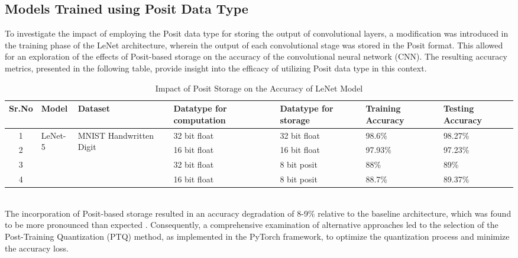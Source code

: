 \subsection{Models Trained using Posit Data Type}
To investigate the impact of employing the Posit data type for storing the output of convolutional layers, a modification was introduced in the training phase of the LeNet architecture, wherein the output of each convolutional stage was stored in the Posit format. This allowed for an exploration of the effects of Posit-based storage on the accuracy of the convolutional neural network (CNN). The resulting accuracy metrics, presented in the following table, provide insight into the efficacy of utilizing Posit data type in this context.\\
\begin{table}[h]
    \centering
    \begin{tabularx}{1.1\textwidth}{|c|X|X|X|X|X|X|}
        \hline
        \textbf{Sr.No} & \textbf{Model} & \textbf{Dataset}  & \textbf{Datatype for computation} & \textbf{Datatype for storage} & \textbf{Training Accuracy} & \textbf{Testing Accuracy} \\
        \hline
        1 &\multirow{4}{*}{LeNet-5}  & \multirow{4}{6em}{MNIST Handwritten Digit}  & 32 bit float  & 32 bit float  & 98.6\% & 98.27\% \\\cline{4 - 7}
        
        2 &  &   & 16 bit float  & 16 bit float  & 97.93\% & 97.23\% \\\cline{4 - 7}
        
        3 &  &   & 32 bit float  & 8 bit posit  & 88\% & 89\% \\\cline{4 - 7}
        
        4 &  &    & 16 bit float  & 8 bit posit  & 88.7\% & 89.37\% \\\hline
   
    \end{tabularx}
    \caption{Impact of Posit Storage on the Accuracy of LeNet Model}
    \label{tab:posti_comparison}
\end{table}\\
The incorporation of Posit-based storage resulted in an accuracy degradation of 8-9\% relative to the baseline architecture, which was found to be more pronounced than expected . Consequently, a comprehensive examination of alternative approaches led to the selection of the Post-Training Quantization (PTQ) method, as implemented in the PyTorch framework, to optimize the quantization process and minimize the accuracy loss. 
